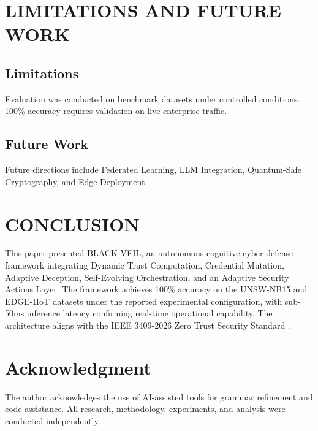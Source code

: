 \documentclass[10pt,journal,compsoc]{IEEEtran}
\begin{document}
\section{LIMITATIONS AND FUTURE WORK}
\subsection{Limitations}
Evaluation was conducted on benchmark datasets under controlled conditions. 100\% accuracy requires validation on live enterprise traffic.

\subsection{Future Work}
Future directions include Federated Learning, LLM Integration, Quantum-Safe Cryptography, and Edge Deployment.

\section{CONCLUSION}
This paper presented BLACK VEIL, an autonomous cognitive cyber defense framework integrating Dynamic Trust Computation, Credential Mutation, Adaptive Deception, Self-Evolving Orchestration, and an Adaptive Security Actions Layer. The framework achieves 100\% accuracy on the UNSW-NB15 and EDGE-IIoT datasets under the reported experimental configuration, with sub-50ms inference latency confirming real-time operational capability. The architecture aligns with the IEEE 3409-2026 Zero Trust Security Standard \cite{ieee3409}.

\section*{Acknowledgment}
The author acknowledges the use of AI-assisted tools for grammar refinement and code assistance. All research, methodology, experiments, and analysis were conducted independently.



\end{document}
